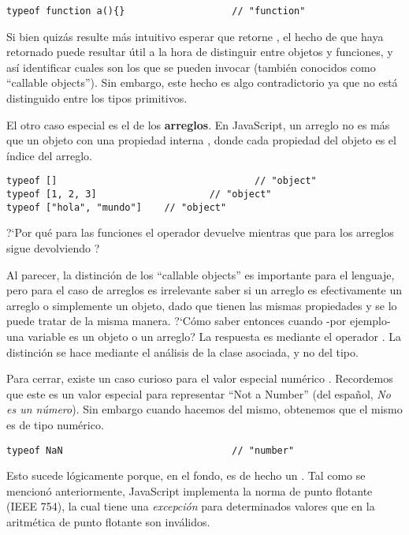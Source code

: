 \begin{lstlisting}[title={Analizando \code{typeof} de una función}]
typeof function a(){}					// "function"
\end{lstlisting}

Si bien quizás resulte más intuitivo esperar que retorne , el hecho de que haya retornado  puede resultar útil a la hora de distinguir entre objetos y funciones, y así identificar cuales son los que se pueden invocar (también conocidos como "`callable objects"'). Sin embargo, este hecho es algo contradictorio ya que  no está distinguido entre los tipos primitivos.

El otro caso especial es el de los \textbf{arreglos}. En JavaScript, un arreglo no es más que un objeto con una propiedad interna , donde cada propiedad del objeto es el índice del arreglo.

\begin{lstlisting}[title={Analizando \code{typeof} de arreglos}]
typeof []									// "object"
typeof [1, 2, 3]					// "object"
typeof ["hola", "mundo"]	// "object"
\end{lstlisting}

?`Por qué para las funciones el operador  devuelve  mientras que para los arreglos sigue devolviendo ? 

Al parecer, la distinción de los "`callable objects"' es importante para el lenguaje, pero para el caso de arreglos es irrelevante saber si un arreglo es efectivamente un arreglo o simplemente un objeto, dado que tienen las mismas propiedades y se lo puede tratar de la misma manera. ?`Cómo saber entonces cuando -por ejemplo- una variable es un objeto o un arreglo? La respuesta es mediante el operador . La distinción se hace mediante el análisis de la clase asociada, y no del tipo.

Para cerrar, existe un caso curioso para el valor especial numérico . Recordemos que este es un valor especial para representar "`Not a Number"' (del español, \textit{No es un número}). Sin embargo cuando hacemos  del mismo, obtenemos que el mismo es de tipo numérico.

\begin{lstlisting}[title={Analizando \code{typeof} de \code{NaN}}]
typeof NaN								// "number"
\end{lstlisting}

Esto sucede lógicamente porque, en el fondo,  es de hecho un . Tal como se mencionó anteriormente, JavaScript implementa la norma de punto flotante (IEEE 754), la cual tiene una \textit{excepción} para determinados valores que en la aritmética de punto flotante son inválidos.